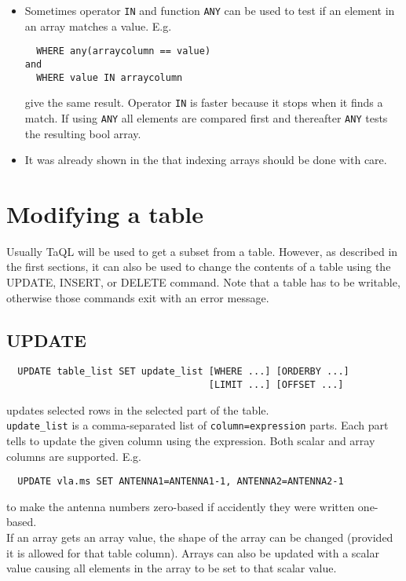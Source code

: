 \begin{itemize}
\item
Sometimes operator \texttt{IN} and function \texttt{ANY} can be used to test
if an element in an array matches a value. E.g.
\begin{verbatim}
  WHERE any(arraycolumn == value)
and
  WHERE value IN arraycolumn
\end{verbatim}
give the same result.
Operator \texttt{IN} is faster because it stops when it finds a
match. If using \texttt{ANY} all elements are compared first and thereafter
\texttt{ANY} tests the resulting bool array.

\item
It was already shown in the 
that indexing arrays should be done with care.
\end{itemize}


\section{\label{TAQL:MODIFYING}Modifying a table}
Usually TaQL will be used to get a subset from a table. However, as
described in the first sections, it can also be used to change the
contents of a table using the UPDATE, INSERT, or DELETE command.
Note that a table has to be writable, otherwise those commands
exit with an error message.

\subsection{UPDATE}
\begin{verbatim}
  UPDATE table_list SET update_list [WHERE ...] [ORDERBY ...]
                                    [LIMIT ...] [OFFSET ...]
\end{verbatim}
updates selected rows in the selected part of the table.
\\\texttt{update\_list}
is a comma-separated list of \texttt{column=expression} parts.
Each part tells to update the given column using the
expression. Both scalar and array columns are supported.
E.g.
\begin{verbatim}
  UPDATE vla.ms SET ANTENNA1=ANTENNA1-1, ANTENNA2=ANTENNA2-1
\end{verbatim}
to make the antenna numbers zero-based if accidently they were
written one-based.
\\If an array gets an array value, the shape of the array can be
changed (provided it is allowed for that table column).
Arrays can also be updated with a scalar value causing all elements
in the array to be set to that scalar value.

